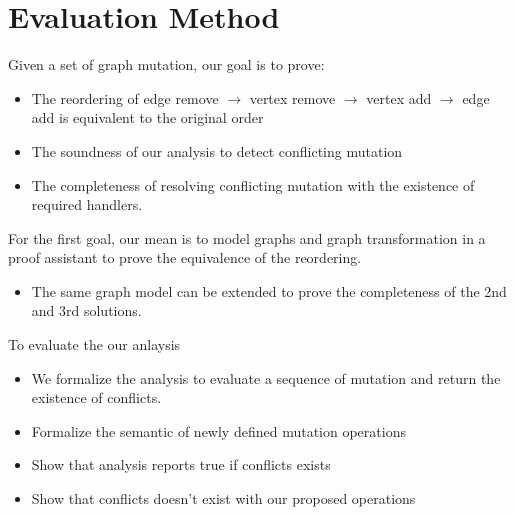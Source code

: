 \section{Evaluation Method}
\begin{frame}
Given a set of graph mutation, our goal is to prove:
  	\begin{itemize}
		 \item The reordering of edge remove $\rightarrow$ vertex remove $\rightarrow$
		 vertex add $\rightarrow$ edge add is equivalent to the original order
		 \item The soundness of our analysis to detect conflicting mutation
		 \item The completeness of resolving conflicting mutation with the
		 existence of required handlers.
	\end{itemize}
For the first goal, our mean is to model graphs and graph transformation in a
proof assistant to prove the equivalence of the reordering.
	\begin{itemize}
	  \item The same graph model can be extended to prove the completeness of the
	  2nd and 3rd solutions.
	\end{itemize}
\end{frame}

\begin{frame}
 To evaluate the our anlaysis
\begin{itemize}
  \item We formalize the analysis to evaluate a sequence of mutation and return
  the existence of conflicts.
\item Formalize the semantic of newly defined mutation operations
\item Show that analysis reports true if conflicts exists
\item Show that conflicts doesn't exist with our proposed operations
\end{itemize}

\end{frame}

 